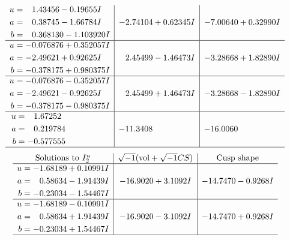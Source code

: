 \documentclass[1p]{elsarticle_modified}
\theoremstyle{definition}
\newcommand{\I}{\sqrt{-1}}
\begin{document}
$$\begin{array}{c|c|c}
\begin{aligned}
u &= \phantom{-}1.43456 - 0.19655 I \\
a &= \phantom{-}0.38745 - 1.66784 I \\
b &= \phantom{-}0.368130 - 1.103920 I\end{aligned}
 & -2.74104 + 0.62345 I & -7.00640 + 0.32990 I \\ \hline\begin{aligned}
u &= -0.076876 + 0.352057 I \\
a &= -2.49621 + 0.92625 I \\
b &= -0.378175 + 0.980375 I\end{aligned}
 & \phantom{-}2.45499 - 1.46473 I & -3.28668 + 1.82890 I \\ \hline\begin{aligned}
u &= -0.076876 - 0.352057 I \\
a &= -2.49621 - 0.92625 I \\
b &= -0.378175 - 0.980375 I\end{aligned}
 & \phantom{-}2.45499 + 1.46473 I & -3.28668 - 1.82890 I \\ \hline\begin{aligned}
u &= \phantom{-}1.67252\phantom{ +0.000000I} \\
a &= \phantom{-}0.219784\phantom{ +0.000000I} \\
b &= -0.577555\phantom{ +0.000000I}\end{aligned}
 & -11.3408\phantom{ +0.000000I} & -16.0060\phantom{ +0.000000I}\\
 \hline 
 \end{array}$$\newpage$$\begin{array}{c|c|c}  
\text{Solutions to }I^u_{2}& \I (\text{vol} + \sqrt{-1}CS) & \text{Cusp shape}\\
 \hline 
\begin{aligned}
u &= -1.68189 + 0.10991 I \\
a &= \phantom{-}0.58634 - 1.91439 I \\
b &= -0.23034 - 1.54467 I\end{aligned}
 & -16.9020 + 3.1092 I & -14.7470 - 0.9268 I \\ \hline\begin{aligned}
u &= -1.68189 - 0.10991 I \\
a &= \phantom{-}0.58634 + 1.91439 I \\
b &= -0.23034 + 1.54467 I\end{aligned}
 & -16.9020 - 3.1092 I & -14.7470 + 0.9268 I\\
 \hline 
 \end{array}$$\newpage
\end{document}
